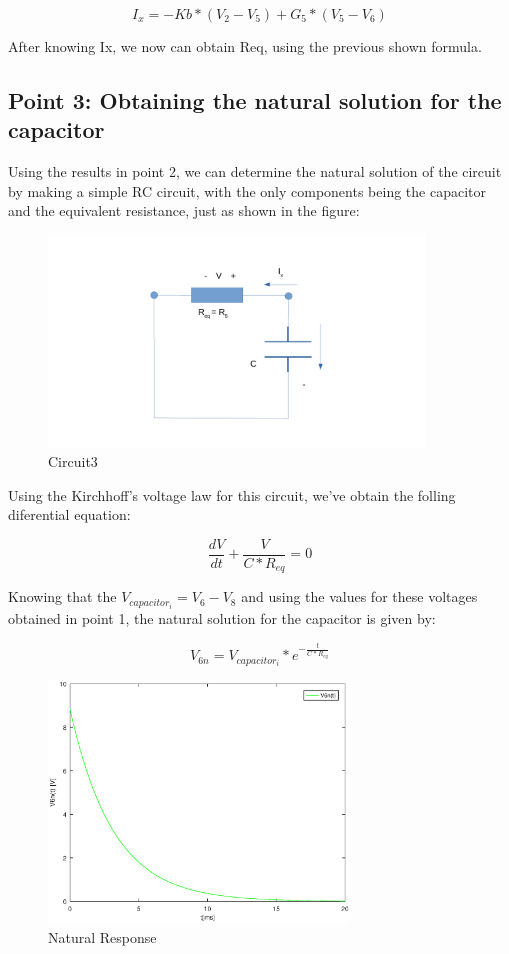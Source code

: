 \setlength{\parskip}{1em}

\begin{equation}
I_x = -Kb*(V_2 - V_5) + G_5*(V_5 - V_6) 
\end{equation}

After knowing Ix, we now can obtain Req, using the previous shown formula.

\subsection{Point 3: Obtaining the natural solution for the capacitor}

Using the results in point 2, we can determine the natural solution of the circuit by making a simple RC circuit, with the only components being the capacitor and the equivalent resistance, just as shown in the figure:

\begin{figure}[H]
\centering
\includegraphics[width = 10cm]{circuit3.pdf}
\caption {Circuit3}
\end{figure}

Using the Kirchhoff's voltage law for this circuit, we've obtain the folling diferential equation:

\begin{equation}
\frac{dV}{dt} + \frac{V}{C*R_{eq}} = 0
\end{equation}

Knowing that the $V_{capacitor_i} = V_{6} - V_{8}$ and using the values for these voltages obtained in point 1, the natural solution for the capacitor is given by:

\begin{equation}
V_{6n} = V_{capacitor_i} * e^{-\frac{t}{C*R_{eq}}}
\end{equation}

\begin{figure}[H]
\centering
\includegraphics[width = 8cm]{NaturalResponse.eps}
\caption {Natural Response}
\end{figure}



